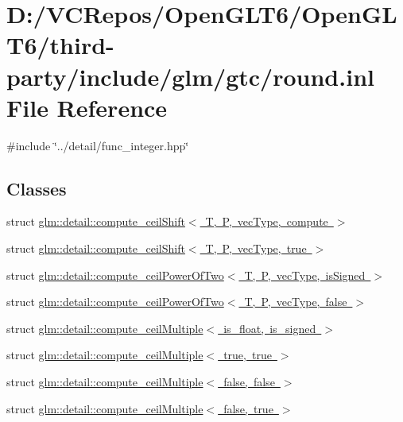 \hypertarget{round_8inl}{}\section{D\+:/\+V\+C\+Repos/\+Open\+G\+L\+T6/\+Open\+G\+L\+T6/third-\/party/include/glm/gtc/round.inl File Reference}
\label{round_8inl}
{\ttfamily \#include \char`\"{}../detail/func\+\_\+integer.\+hpp\char`\"{}}\newline
\subsection*{Classes}
\begin{DoxyCompactItemize}
\item 
struct \mbox{\hyperlink{structglm_1_1detail_1_1compute__ceil_shift}{glm\+::detail\+::compute\+\_\+ceil\+Shift$<$ T, P, vec\+Type, compute $>$}}
\item 
struct \mbox{\hyperlink{structglm_1_1detail_1_1compute__ceil_shift_3_01_t_00_01_p_00_01vec_type_00_01true_01_4}{glm\+::detail\+::compute\+\_\+ceil\+Shift$<$ T, P, vec\+Type, true $>$}}
\item 
struct \mbox{\hyperlink{structglm_1_1detail_1_1compute__ceil_power_of_two}{glm\+::detail\+::compute\+\_\+ceil\+Power\+Of\+Two$<$ T, P, vec\+Type, is\+Signed $>$}}
\item 
struct \mbox{\hyperlink{structglm_1_1detail_1_1compute__ceil_power_of_two_3_01_t_00_01_p_00_01vec_type_00_01false_01_4}{glm\+::detail\+::compute\+\_\+ceil\+Power\+Of\+Two$<$ T, P, vec\+Type, false $>$}}
\item 
struct \mbox{\hyperlink{structglm_1_1detail_1_1compute__ceil_multiple}{glm\+::detail\+::compute\+\_\+ceil\+Multiple$<$ is\+\_\+float, is\+\_\+signed $>$}}
\item 
struct \mbox{\hyperlink{structglm_1_1detail_1_1compute__ceil_multiple_3_01true_00_01true_01_4}{glm\+::detail\+::compute\+\_\+ceil\+Multiple$<$ true, true $>$}}
\item 
struct \mbox{\hyperlink{structglm_1_1detail_1_1compute__ceil_multiple_3_01false_00_01false_01_4}{glm\+::detail\+::compute\+\_\+ceil\+Multiple$<$ false, false $>$}}
\item 
struct \mbox{\hyperlink{structglm_1_1detail_1_1compute__ceil_multiple_3_01false_00_01true_01_4}{glm\+::detail\+::compute\+\_\+ceil\+Multiple$<$ false, true $>$}}
\item 

\end{DoxyCompactItemize}
